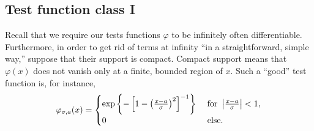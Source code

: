 \subsection{Test function class I}

Recall that we require \cite{schwartz} our tests functions $\varphi$
to be infinitely often differentiable. Furthermore, in order to get rid of terms at infinity ``in a straightforward, simple way,''
suppose that their support is compact.
Compact support means that $\varphi (x)$ does not vanish only at a finite, bounded region of $x$.
Such a ``good'' test function is, for instance,
\begin{equation}
\varphi_{\sigma ,a}(x)
=
\begin{cases}
\exp \left\{ -\left[ 1 - \left( \frac{x-a}{\sigma }\right)^2 \right]^{-1} \right\} & \textrm{ for } \left\vert  {x-a\over \sigma }\right\vert <1, \\
                                0 & \textrm{ else.}
\end{cases}
\label{2018-m-ch-di-tf1}
\end{equation}

